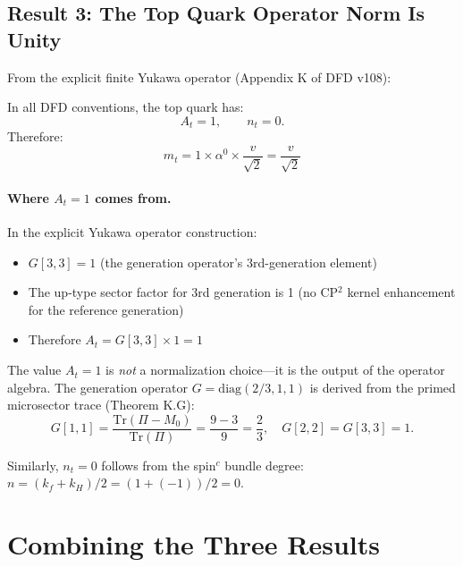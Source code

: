 \documentclass[11pt,a4paper]{article}
\newcommand{\Tr}{\mathrm{Tr}}
\theoremstyle{definition}
\theoremstyle{remark}
\begin{document}
\subsection{Result 3: The Top Quark Operator Norm Is Unity}

From the explicit finite Yukawa operator (Appendix K of DFD v108):

\begin{tcolorbox}[colback=green!5!white, colframe=green!60!black,
  title={Top Quark Normalization}]
In all DFD conventions, the top quark has:
\begin{equation}
A_t = 1, \qquad n_t = 0.
\end{equation}
Therefore:
\begin{equation}\label{eq:mt}
\boxed{m_t = 1 \times \alpha^0 \times \frac{v}{\sqrt{2}} = \frac{v}{\sqrt{2}}}
\end{equation}
\end{tcolorbox}

\paragraph{Where $A_t = 1$ comes from.}
In the explicit Yukawa operator construction:
\begin{itemize}
\item $G[3,3] = 1$ (the generation operator's 3rd-generation element)
\item The up-type sector factor for 3rd generation is 1 (no CP$^2$ kernel
  enhancement for the reference generation)
\item Therefore $A_t = G[3,3] \times 1 = 1$
\end{itemize}

The value $A_t = 1$ is \emph{not} a normalization choice---it is the output
of the operator algebra. The generation operator $G = \mathrm{diag}(2/3, 1, 1)$
is derived from the primed microsector trace (Theorem K.G):
\[
G[1,1] = \frac{\Tr(\Pi - M_0)}{\Tr(\Pi)} = \frac{9-3}{9} = \frac{2}{3},
\quad G[2,2] = G[3,3] = 1.
\]

Similarly, $n_t = 0$ follows from the spin$^c$ bundle degree:
$n = (k_f + k_H)/2 = (1 + (-1))/2 = 0$.

\section{Combining the Three Results}
\label{sec:combine}
\end{document}
